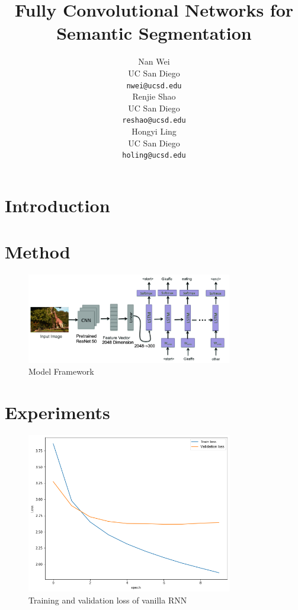\documentclass{article} %
\title{Fully Convolutional Networks for Semantic
Segmentation}
\author{
Nan Wei \\
UC San Diego\\
\texttt{nwei@ucsd.edu} \\
\And
Renjie Shao \\
UC San Diego \\
\texttt{reshao@ucsd.edu} \\
\And
Hongyi Ling \\
UC San Diego \\
\texttt{holing@ucsd.edu} \\
}
\begin{document}
\maketitle

\begin{abstract}

\end{abstract}

\section{Introduction}


\section{Method}

\begin{figure}[htb!]
    \centering
     \includegraphics[width=0.8\textwidth]{frame}
    \caption{Model Framework \cite{10.1007/978-3-030-04780-1_23}}
    \label{loss_fcn}
\end{figure}

\section{Experiments}

\begin{figure}[htb!]
    \centering
     \includegraphics[width=0.8\textwidth]{RNNloss}
    \caption{Training and validation loss of vanilla RNN}
    \label{RNNloss}
\end{figure}
\end{document}
